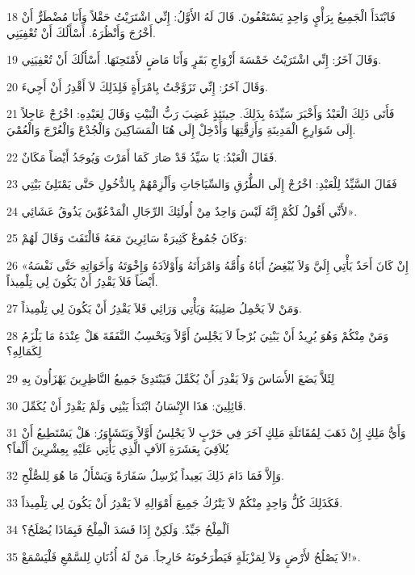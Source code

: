 \par 18 فَابْتَدَأَ الْجَمِيعُ بِرَأْيٍ وَاحِدٍ يَسْتَعْفُونَ. قَالَ لَهُ الأَوَّلُ: إِنِّي اشْتَرَيْتُ حَقْلاً وَأَنَا مُضْطَرٌّ أَنْ أَخْرُجَ وَأَنْظُرَهُ. أَسْأَلُكَ أَنْ تُعْفِيَنِي.
\par 19 وَقَالَ آخَرُ: إِنِّي اشْتَرَيْتُ خَمْسَةَ أَزْوَاجِ بَقَرٍ وَأَنَا مَاضٍ لأَمْتَحِنَهَا. أَسْأَلُكَ أَنْ تُعْفِيَنِي.
\par 20 وَقَالَ آخَرُ: إِنِّي تَزَوَّجْتُ بِامْرَأَةٍ فَلِذَلِكَ لاَ أَقْدِرُ أَنْ أَجِيءَ.
\par 21 فَأَتَى ذَلِكَ الْعَبْدُ وَأَخْبَرَ سَيِّدَهُ بِذَلِكَ. حِينَئِذٍ غَضِبَ رَبُّ الْبَيْتِ وَقَالَ لِعَبْدِهِ: اخْرُجْ عَاجِلاً إِلَى شَوَارِعِ الْمَدِينَةِ وَأَزِقَّتِهَا وَأَدْخِلْ إِلَى هُنَا الْمَسَاكِينَ وَالْجُدْعَ وَالْعُرْجَ وَالْعُمْيَ.
\par 22 فَقَالَ الْعَبْدُ: يَا سَيِّدُ قَدْ صَارَ كَمَا أَمَرْتَ وَيُوجَدُ أَيْضاً مَكَانٌ.
\par 23 فَقَالَ السَّيِّدُ لِلْعَبْدِ: اخْرُجْ إِلَى الطُّرُقِ وَالسِّيَاجَاتِ وَأَلْزِمْهُمْ بِالدُّخُولِ حَتَّى يَمْتَلِئَ بَيْتِي
\par 24 لأَنِّي أَقُولُ لَكُمْ إِنَّهُ لَيْسَ وَاحِدٌ مِنْ أُولَئِكَ الرِّجَالِ الْمَدْعُوِّينَ يَذُوقُ عَشَائِي».
\par 25 وَكَانَ جُمُوعٌ كَثِيرَةٌ سَائِرِينَ مَعَهُ فَالْتَفَتَ وَقَالَ لَهُمْ:
\par 26 «إِنْ كَانَ أَحَدٌ يَأْتِي إِلَيَّ وَلاَ يُبْغِضُ أَبَاهُ وَأُمَّهُ وَامْرَأَتَهُ وَأَوْلاَدَهُ وَإِخْوَتَهُ وَأَخَوَاتِهِ حَتَّى نَفْسَهُ أَيْضاً فَلاَ يَقْدِرُ أَنْ يَكُونَ لِي تِلْمِيذاً.
\par 27 وَمَنْ لاَ يَحْمِلُ صَلِيبَهُ وَيَأْتِي وَرَائِي فَلاَ يَقْدِرُ أَنْ يَكُونَ لِي تِلْمِيذاً.
\par 28 وَمَنْ مِنْكُمْ وَهُوَ يُرِيدُ أَنْ يَبْنِيَ بُرْجاً لاَ يَجْلِسُ أَوَّلاً وَيَحْسِبُ النَّفَقَةَ هَلْ عِنْدَهُ مَا يَلْزَمُ لِكَمَالِهِ؟
\par 29 لِئَلاَّ يَضَعَ الأَسَاسَ وَلاَ يَقْدِرَ أَنْ يُكَمِّلَ فَيَبْتَدِئَ جَمِيعُ النَّاظِرِينَ يَهْزَأُونَ بِهِ
\par 30 قَائِلِينَ: هَذَا الإِنْسَانُ ابْتَدَأَ يَبْنِي وَلَمْ يَقْدِرْ أَنْ يُكَمِّلَ.
\par 31 وَأَيُّ مَلِكٍ إِنْ ذَهَبَ لِمُقَاتَلَةِ مَلِكٍ آخَرَ فِي حَرْبٍ لاَ يَجْلِسُ أَوَّلاً وَيَتَشَاوَرُ: هَلْ يَسْتَطِيعُ أَنْ يُلاَقِيَ بِعَشَرَةِ آلاَفٍ الَّذِي يَأْتِي عَلَيْهِ بِعِشْرِينَ أَلْفاً؟
\par 32 وَإِلاَّ فَمَا دَامَ ذَلِكَ بَعِيداً يُرْسِلُ سَفَارَةً وَيَسْأَلُ مَا هُوَ لِلصُّلْحِ.
\par 33 فَكَذَلِكَ كُلُّ وَاحِدٍ مِنْكُمْ لاَ يَتْرُكُ جَمِيعَ أَمْوَالِهِ لاَ يَقْدِرُ أَنْ يَكُونَ لِي تِلْمِيذاً.
\par 34 اَلْمِلْحُ جَيِّدٌ. وَلَكِنْ إِذَا فَسَدَ الْمِلْحُ فَبِمَاذَا يُصْلَحُ؟
\par 35 لاَ يَصْلُحُ لأَرْضٍ وَلاَ لِمَزْبَلَةٍ فَيَطْرَحُونَهُ خَارِجاً. مَنْ لَهُ أُذُنَانِ لِلسَّمْعِ فَلْيَسْمَعْ!».

